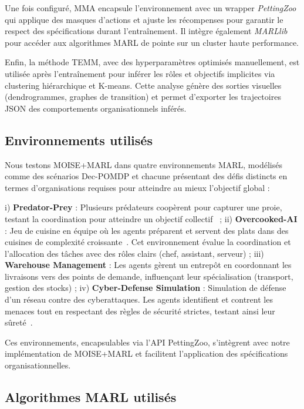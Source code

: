 \documentclass[dissemination]{jfsma}
\begin{document}
Une fois configuré, MMA encapsule l'environnement avec un wrapper \textit{PettingZoo} qui applique des masques d'actions et ajuste les récompenses pour garantir le respect des spécifications durant l'entraînement. Il intègre également \textit{MARLlib}~\cite{hu2021marlib} pour accéder aux algorithmes MARL de pointe sur un cluster haute performance.

Enfin, la méthode TEMM, avec des hyperparamètres optimisés manuellement, est utilisée après l'entraînement pour inférer les rôles et objectifs implicites via clustering hiérarchique et K-means. Cette analyse génère des sorties visuelles (dendrogrammes, graphes de transition) et permet d'exporter les trajectoires JSON des comportements organisationnels inférés.

\subsection{Environnements utilisés}

Nous testons MOISE+MARL dans quatre environnements MARL, modélisés comme des scénarios Dec-POMDP et chacune présentant des défis distincts en termes d'organisations requises pour atteindre au mieux l'objectif global :

i) \textbf{Predator-Prey} : Plusieurs prédateurs coopèrent pour capturer une proie, testant la coordination pour atteindre un objectif collectif~\cite{lowe2017multi}
 ; \quad
ii) \textbf{Overcooked-AI} : Jeu de cuisine en équipe où les agents préparent et servent des plats dans des cuisines de complexité croissante~\cite{overcookedai}. Cet environnement évalue la coordination et l'allocation des tâches avec des rôles clairs (chef, assistant, serveur)
; \quad
iii) \textbf{Warehouse Management} : Les agents gèrent un entrepôt en coordonnant les livraisons vers des points de demande, influençant leur spécialisation (transport, gestion des stocks)
; \quad
iv) \textbf{Cyber-Defense Simulation} : Simulation de défense d'un réseau contre des cyberattaques. Les agents identifient et contrent les menaces tout en respectant des règles de sécurité strictes, testant ainsi leur sûreté~\cite{Maxwell2021}.

Ces environnements, encapsulables via l'API PettingZoo, s'intègrent avec notre implémentation de MOISE+MARL et facilitent l'application des spécifications organisationnelles.

\subsection{Algorithmes MARL utilisés}
\end{document}
